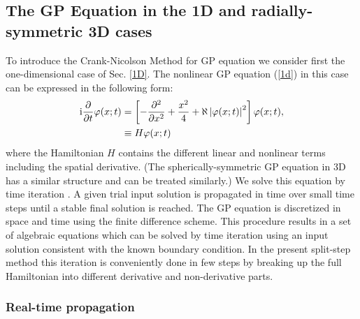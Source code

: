 \documentclass[onecolumn]{elsart3p}
\begin{document}
\subsection{The GP Equation in the 1D and radially-symmetric 3D
cases}

To introduce the Crank-Nicolson Method \cite{koonin,ames,dtray}
for GP equation we consider
first the one-dimensional case of Sec. \ref{1D}. The
 nonlinear GP equation (\ref{1d})
in this
case can be expressed in the following form:
\begin{align}
\mbox{i}\frac{\partial }{\partial t} \varphi (x;t) & =
\left[-\frac{\partial^2}
{\partial x^2}+\frac{x^2}{4}+ \aleph %
\left| {\varphi(x;t)}
\right| ^2\right] \varphi (x;t)  , \notag \\
 & \equiv H  \varphi (x;t)
\label{e1d}
\end{align}
where the Hamiltonian $H$ contains the different linear and nonlinear terms
including the spatial derivative. (The spherically-symmetric GP equation in 3D
has a similar structure and can be treated similarly.) We solve this equation by
time iteration \cite{koonin,ames,dtray}. A given  trial input solution is
propagated in time over small time steps until a stable final  solution is
reached. The GP equation is discretized in space and time using the finite
difference scheme. This procedure results in a set of algebraic equations which
can be solved by time iteration using an input solution consistent with the
known boundary condition. In the present split-step method \cite{ames} this
iteration is conveniently done in few steps by breaking up the full Hamiltonian
into different derivative and non-derivative parts.



\subsubsection{Real-time propagation} \label{RT}
\end{document}
